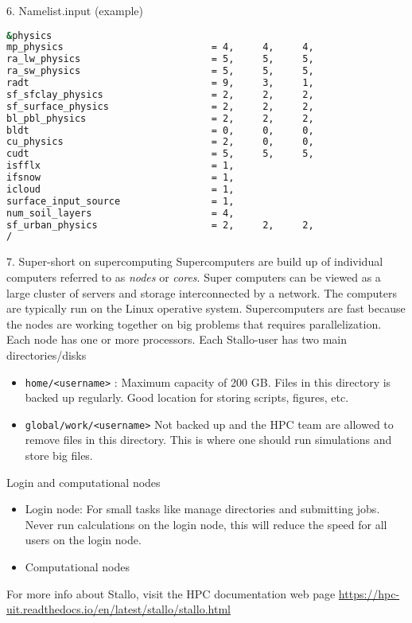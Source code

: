 \documentclass{beamer}
\begin{document}
\begin{frame}[fragile, allowframebreaks=.95, t]{6. Namelist.input (example)}
\begin{lstlisting}[backgroundcolor = \color{light-gray}, language=bash]
&physics
mp_physics                          = 4,     4,     4,
ra_lw_physics                       = 5,     5,     5,
ra_sw_physics                       = 5,     5,     5,
radt                                = 9,     3,     1,
sf_sfclay_physics                   = 2,     2,     2,
sf_surface_physics                  = 2,     2,     2,
bl_pbl_physics                      = 2,     2,     2,
bldt                                = 0,     0,     0,
cu_physics                          = 2,     0,     0,
cudt                                = 5,     5,     5,
isfflx                              = 1,
ifsnow                              = 1,
icloud                              = 1,
surface_input_source                = 1,
num_soil_layers                     = 4,
sf_urban_physics                    = 2,     2,     2,
/
\end{lstlisting}
\end{frame}




\begin{frame}[fragile, allowframebreaks=.9, t]{7. Super-short on supercomputing}
Supercomputers are build up of individual computers referred to as \textit{nodes} or \textit{cores}. Super computers can be viewed as a large cluster of servers and storage interconnected by a network. The computers are typically run on the Linux operative system. 
Supercomputers are fast because the nodes are working together on big problems that requires parallelization.  Each node has one or more processors. 
Each Stallo-user has two main directories/disks
\begin{itemize}
	\item \texttt{home/<username>} : Maximum capacity of 200 GB. Files in this directory is backed up regularly. Good location for storing scripts, figures, etc. 
	\item \texttt{global/work/<username>} Not backed up and the HPC team are allowed to remove files in this directory. This is where one should run simulations and store big files. 
\end{itemize}
Login and computational nodes
\begin{itemize}
	\item Login node: For small tasks like  manage directories and submitting jobs. Never run calculations on the login node, this will reduce the speed for all users on the login node. 
	\item Computational nodes
\end{itemize}
For more info about Stallo, visit the HPC documentation web page \url{https://hpc-uit.readthedocs.io/en/latest/stallo/stallo.html}
\end{frame}
\end{document}
